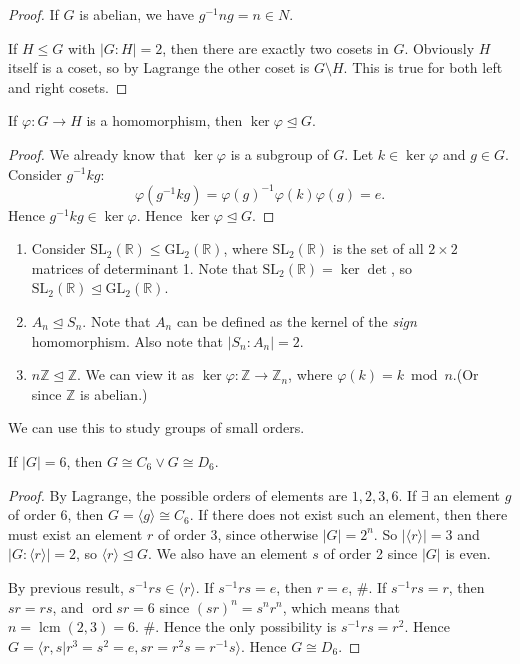 \documentclass[10pt]{article}
\def\le{\leqslant}
\DeclareMathOperator{\ord}{ord}
\DeclareMathOperator{\lcm}{lcm}
\begin{document}
    \begin{proof}
        If $G$ is abelian, we have $ g^{-1}ng=n\in N $.

        If $H\le G$ with $ |G:H|=2$, then there are exactly two cosets in $G$. Obviously $H$ itself is a coset, so by Lagrange the other coset is $ G \setminus H $. This is true for both left and right cosets.
    \end{proof}
    \begin{proposition}\label{prop:4.4}
        If $ \varphi:G\to H $ is a homomorphism, then $ \ker \varphi \trianglelefteq G $.
    \end{proposition}
    \begin{proof}
        We already know that $ \ker \varphi $ is a subgroup of $G$. Let $ k\in \ker \varphi $ and $g\in G$. Consider $ g^{-1}kg $:
        \[
            \varphi(g^{-1}kg)=\varphi(g)^{-1}\varphi(k) \varphi(g)=e
        .\]
        Hence $ g^{-1}kg\in \ker \varphi $. Hence $\ker \varphi \trianglelefteq G$.
    \end{proof}
    \begin{example}
        \begin{enumerate}[(1)]
            \item Consider $ \mathrm{SL}_2(\mathbb{R})\le \mathrm{GL_2}(\mathbb{R}) $, where $ \mathrm{SL}_2(\mathbb{R}) $ is the set of all $ 2 \times 2 $ matrices of determinant 1. Note that $ \mathrm{SL}_2(\mathbb{R}) = \ker \det $, so $ \mathrm{SL}_2(\mathbb{R})\trianglelefteq  \mathrm{GL_2}(\mathbb{R}) $.
            \item $ A_n\trianglelefteq S_n $. Note that $ A_n $ can be defined as the kernel of the \textit{sign} homomorphism. Also note that $ |S_n:A_n|=2 $.
            \item $ n \mathbb{Z} \trianglelefteq \mathbb{Z} $. We can view it as $ \ker \varphi: \mathbb{Z} \to \mathbb{Z}_n $, where $ \varphi(k)=k \bmod n $.(Or since $ \mathbb{Z} $ is abelian.)
        \end{enumerate}
    \end{example}
    We can use this to study groups of small orders.
    \begin{proposition}\label{prop:4.6}
        If $ |G|=6 $, then $ G \cong C_6 \lor G \cong D_6 $.
    \end{proposition}
    \begin{proof}
        By Lagrange, the possible orders of elements are $1,2,3,6$. If $ \exists $ an element $g$ of order 6, then $ G = \langle g \rangle \cong C_6 $. If there does not exist such an element, then there must exist an element $ r $ of order 3, since otherwise $|G|=2^n$. So $ |\langle r \rangle |=3 $ and $ |G:\langle r \rangle |=2 $, so $ \langle r \rangle \trianglelefteq G $. We also have an element $s$ of order 2 since $|G|$ is even. 
        
        By previous result, $ s^{-1}rs\in \langle r \rangle $. If $ s^{-1}rs=e $, then $ r=e $, \#. If $ s^{-1}rs=r $, then $sr=rs$, and $ \ord sr=6 $ since $ (sr)^n=s^nr^n $, which means that $ n=\lcm(2,3)=6 $. \#. Hence the only possibility is $ s^{-1}rs=r^2 $. Hence $ G=\langle r,s|r^3=s^2=e, sr=r^2s=r^{-1}s \rangle  $. Hence $ G \cong D_6 $.
    \end{proof}
\end{document}
